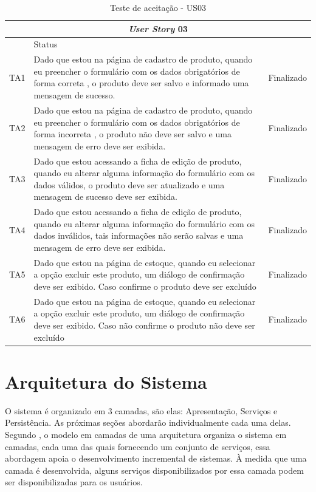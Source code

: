 \documentclass[a4paper,12pt]{monografia}
\begin{document}
\begin{longtable}{|l|p{11.8cm}|c|}
\caption{Teste de aceitação - US03}
\label{quadro:teste-aceitacaoi-us03}
\hline
\multicolumn{3}{|c|}{\textbf{\textit{User Story} 03}}\\
\hline		
\rowcolor{ballblue}
\multicolumn{2}{|c|}{Testes de aceitação} & Status\\	
\hline
TA1 & Dado que estou na página de cadastro de produto, quando eu preencher o formulário com os dados obrigatórios de forma correta , o produto deve ser salvo e informado uma mensagem de sucesso.   & Finalizado\\
\hline
TA2 & Dado que estou na página de cadastro de produto, quando eu preencher o formulário com os dados obrigatórios de forma incorreta , o produto não deve ser salvo e uma mensagem de erro deve ser exibida.   & Finalizado\\
\hline
TA3 & Dado que estou acessando a ficha de edição de produto, quando eu alterar alguma informação do formulário com os dados válidos, o produto deve ser atualizado e uma mensagem de sucesso deve ser exibida.   & Finalizado\\
\hline
TA4 & Dado que estou acessando a ficha de edição de produto, quando eu alterar alguma informação do formulário com os dados inválidos, tais informações não serão salvas e uma mensagem de erro deve ser exibida.   & Finalizado\\
\hline
TA5 & Dado que estou na página de estoque, quando eu selecionar a opção excluir este produto, um diálogo de confirmação deve ser exibido. Caso confirme o produto deve ser excluído  & Finalizado\\
\hline
TA6 & Dado que estou na página de estoque, quando eu selecionar a opção excluir este produto, um diálogo de confirmação deve ser exibido. Caso não confirme o produto não deve ser excluído  & Finalizado\\
\hline
\end{longtable}


\section{Arquitetura do Sistema} %
\label{sec:projeto_arquitetural}

O sistema é organizado em 3 camadas, são elas: Apresentação, Serviços e Persistência. As próximas seções abordarão individualmente cada uma delas. Segundo , o modelo em camadas de uma arquitetura organiza o sistema em camadas, cada uma das quais fornecendo um conjunto de serviços, essa abordagem apoia o desenvolvimento incremental de sistemas. À medida que uma camada é desenvolvida, alguns serviços disponibilizados por essa camada podem ser disponibilizadas para os usuários. 
\end{document}
